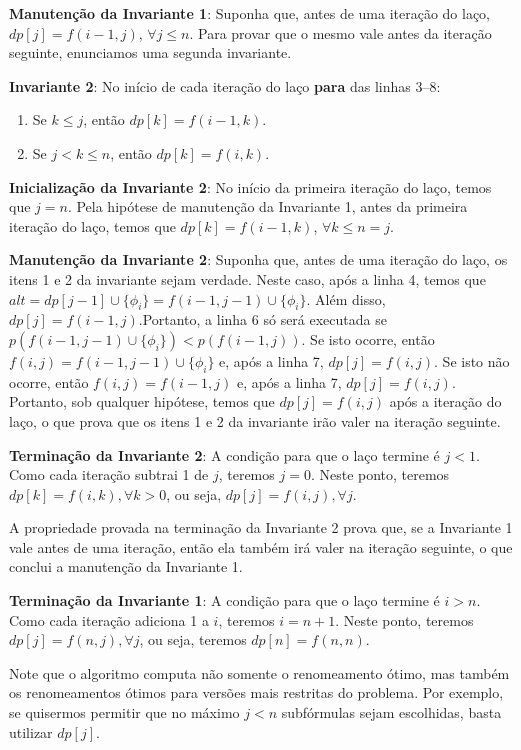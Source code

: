\textbf{Manutenção da Invariante 1}: Suponha que, antes de uma iteração do laço,\break $dp[j] = f(i-1,j)$, $\forall j \leq n$. Para provar que o mesmo vale antes da iteração seguinte, enunciamos uma segunda invariante.

\textbf{Invariante 2}: No início de cada iteração do laço \textbf{para} das linhas 3--8:
\begin{enumerate}
	\item Se $k \leq j$, então $dp[k] = f(i-1,k)$.
	\item Se $j < k \leq n$, então $dp[k] = f(i,k)$.
\end{enumerate}

\textbf{Inicialização da Invariante 2}: No início da primeira iteração do laço, temos que $j = n$. Pela hipótese de manutenção da Invariante 1, antes da primeira iteração do laço, temos que $dp[k] = f(i-1,k)$, $\forall k \leq n = j$.

\textbf{Manutenção da Invariante 2}: Suponha que, antes de uma iteração do laço, os itens 1 e 2 da invariante sejam verdade. Neste caso, após a linha 4, temos que\break $alt = dp[j-1] \cup \{\phi_i \} = f(i-1,j-1) \cup \{\phi_i \}$. Além disso, $dp[j] = f(i-1,j)$.\break Portanto, a linha 6 só será executada se $p(f(i-1,j-1) \cup \{\phi_i \}) < p(f(i-1,j))$. Se isto ocorre, então $f(i,j) = f(i-1,j-1) \cup \{\phi_i \}$ e, após a linha 7, $dp[j] = f(i,j)$. Se isto não ocorre, então $f(i,j) = f(i-1,j)$ e, após a linha 7, $dp[j] = f(i,j)$. Portanto, sob qualquer hipótese, temos que $dp[j] = f(i,j)$ após a iteração do laço, o que prova que os itens 1 e 2 da invariante irão valer na iteração seguinte.

\textbf{Terminação da Invariante 2}: A condição para que o laço termine é $j < 1$. Como cada iteração subtrai 1 de $j$, teremos $j = 0$. Neste ponto, teremos $dp[k] = f(i,k), \forall k > 0$, ou seja, $dp[j] = f(i,j), \forall j$.

A propriedade provada na terminação da Invariante 2 prova que, se a Invariante 1 vale antes de uma iteração, então ela também irá valer na iteração seguinte, o que conclui a manutenção da Invariante 1.

\textbf{Terminação da Invariante 1}: A condição para que o laço termine é $i > n$. Como cada iteração adiciona 1 a $i$, teremos $i = n+1$. Neste ponto, teremos $dp[j] = f(n,j), \forall j$, ou seja, teremos $dp[n] = f(n,n)$.

Note que o algoritmo computa não somente o renomeamento ótimo, mas também os renomeamentos ótimos para versões mais restritas do problema. Por exemplo, se quisermos permitir que no máximo $j < n$ subfórmulas sejam escolhidas, basta utilizar $dp[j]$.

